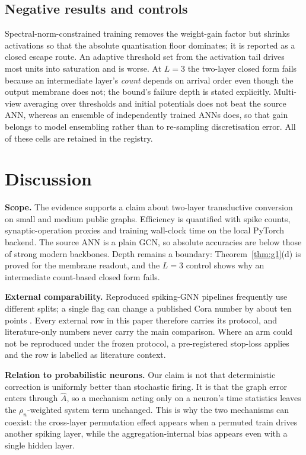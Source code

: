 \documentclass[10pt,twocolumn]{article}
\newcommand{\Ahat}{\hat{A}}
\newcommand{\rhon}{\rho_n}
\begin{document}
\subsection{Negative results and controls}
Spectral-norm-constrained training removes the weight-gain factor but shrinks activations so that
the absolute quantisation floor dominates; it is reported as a closed escape route. An adaptive
threshold set from the activation tail drives most units into saturation and is worse. At $L{=}3$
the two-layer closed form fails because an intermediate layer's \emph{count} depends on arrival
order even though the output membrane does not; the bound's failure depth is stated explicitly.
Multi-view averaging over thresholds and initial potentials does not beat the source ANN, whereas
an ensemble of independently trained ANNs does, so that gain belongs to model ensembling rather
than to re-sampling discretisation error. All of these cells are retained in the registry.

\section{Discussion}
\label{sec:discussion}

\textbf{Scope.} The evidence supports a claim about two-layer transductive conversion on small
and medium public graphs. Efficiency is quantified with spike counts, synaptic-operation proxies and training
wall-clock time on the local PyTorch backend. The
source ANN is a plain GCN, so absolute accuracies are below those of strong modern backbones.
Depth remains a boundary: Theorem~\ref{thm:g1}(d) is proved for the membrane readout, and the
$L{=}3$ control shows why an intermediate count-based closed form fails.

\textbf{External comparability.} Reproduced spiking-GNN pipelines frequently use different splits;
a single flag can change a published Cora number by about ten points \cite{companion}. Every
external row in this paper therefore carries its protocol, and literature-only numbers never carry
the main comparison. Where an arm could not be reproduced under the frozen protocol, a pre-registered
stop-loss applies and the row is labelled as literature context.

\textbf{Relation to probabilistic neurons.} Our claim is not that deterministic correction is
uniformly better than stochastic firing. It is that the graph error enters through $\Ahat$, so a
mechanism acting only on a neuron's time statistics leaves the $\rhon$-weighted system term
unchanged. This is why the two mechanisms can coexist: the cross-layer permutation effect
appears when a permuted train drives another spiking layer, while the aggregation-internal bias
appears even with a single hidden layer.
\end{document}
